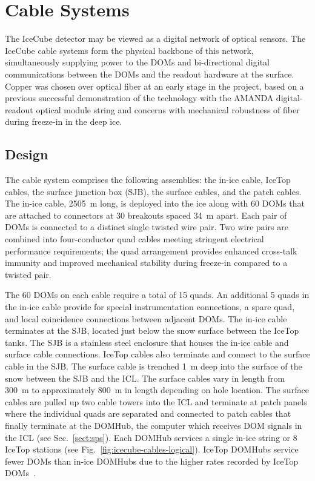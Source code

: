 \section{\label{sec:cable}Cable Systems}

The IceCube detector may be viewed as a digital network of optical
sensors. The IceCube cable systems form the physical backbone of this
network, simultaneously supplying power to the DOMs and bi-directional
digital communications between the DOMs and the readout hardware at the
surface.  Copper was chosen over optical fiber at an early stage in the
project, based on a previous successful demonstration of the technology with
the AMANDA digital-readout optical module string
\cite{AMANDA:string18} and concerns with mechanical robustness of
fiber during freeze-in in the deep ice.

\subsection{Design}

The cable system comprises the following assemblies: the in-ice cable,
IceTop cables, the surface junction box (SJB), the surface cables, and the patch
cables. The in-ice cable, 2505~m long, is deployed
into the ice along with 60 DOMs that are attached to connectors at 30
breakouts spaced 34~m apart. Each pair of DOMs is connected to a distinct
single twisted wire pair. Two wire pairs are combined into four-conductor quad
cables meeting stringent electrical performance requirements; the quad
arrangement provides enhanced cross-talk immunity and improved
mechanical stability during freeze-in compared to a twisted pair.

The 60 DOMs on each cable require a total of 15 quads. An additional 5 quads in the
in-ice cable provide for special instrumentation connections, a spare quad,
and local coincidence connections between adjacent DOMs. The in-ice
cable terminates at the SJB, located just below the snow surface between
the IceTop tanks. The SJB is a stainless steel
enclosure that houses the in-ice cable and surface cable
connections. IceTop cables also terminate and connect to the surface cable
in the SJB. The surface cable is trenched 1~m deep into the
surface of the snow between the SJB and the ICL. The surface
cables vary in length from 300~m to approximately 800~m in length depending on hole location. The surface cables are
pulled up two cable towers into the ICL and terminate at patch panels where the individual
quads are separated and connected to patch cables that finally
terminate at the DOMHub, the computer which receives DOM signals in the ICL (see Sec.~\ref{sect:sps}). Each
DOMHub services a single in-ice string or 8 IceTop stations (see
Fig.~\ref{fig:icecube-cables-logical}). IceTop DOMHubs service fewer
DOMs than in-ice DOMHubs due to the higher rates recorded by IceTop DOMs~\cite{ICECUBE:IceTop}.

